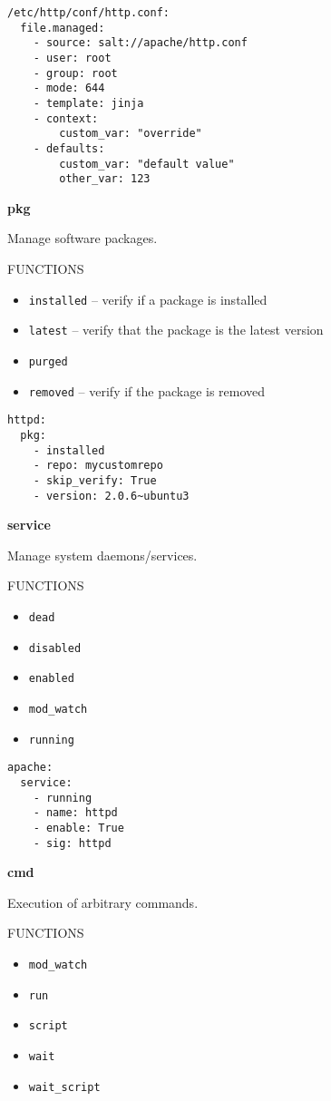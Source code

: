 \documentclass[landscape,a4paper,10pt]{article}
\begin{document}
\begin{multicols}{3}
\begin{verbatim}
/etc/http/conf/http.conf:
  file.managed:
    - source: salt://apache/http.conf
    - user: root
    - group: root
    - mode: 644
    - template: jinja
    - context:
        custom_var: "override"
    - defaults:
        custom_var: "default value"
        other_var: 123
\end{verbatim}

\bfseries{\LARGE{pkg}}

Manage software packages.

FUNCTIONS

\begin{itemize}
  \item \texttt{installed} -- verify if a package is installed
  \item \texttt{latest} -- verify that the package is the latest version
  \item \texttt{purged}
  \item \texttt{removed} -- verify if the package is removed
\end{itemize}

\begin{verbatim}
httpd:
  pkg:
    - installed
    - repo: mycustomrepo
    - skip_verify: True
    - version: 2.0.6~ubuntu3
\end{verbatim}

\bfseries{\LARGE{service}}

Manage system daemons/services.

FUNCTIONS

\begin{itemize}
  \item \texttt{dead}
  \item \texttt{disabled}
  \item \texttt{enabled}
  \item \texttt{mod\_watch}
  \item \texttt{running}
\end{itemize}

\begin{verbatim}
apache:
  service:
    - running
    - name: httpd
    - enable: True
    - sig: httpd
\end{verbatim}


\bfseries{\LARGE{cmd}}

Execution of arbitrary commands.

FUNCTIONS

\begin{itemize}
  \item \texttt{mod\_watch}
  \item \texttt{run}
  \item \texttt{script}
  \item \texttt{wait}
  \item \texttt{wait\_script}
\end{itemize}


\end{multicols}
\end{document}
